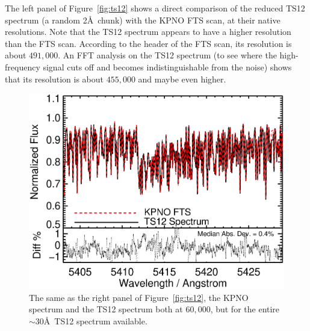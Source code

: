 The left panel of Figure~\ref{fig:ts12} shows a direct comparison of the reduced
TS12 spectrum (a random 2\AA\ chunk) with the KPNO FTS scan, at their
native resolutions. Note that the TS12 spectrum appears to have a
higher resolution than the FTS scan. According to the header of the
FTS scan, its resolution is about $491,000$. An FFT analysis on the TS12
spectrum (to see where the high-frequency signal cuts off and becomes
indistinguishable from the noise) shows that its resolution is about
$455,000$ and maybe even higher.


\begin{figure}[!th]
\centering
\includegraphics[angle=0.,scale=0.45]{het/all_60k_gaus_sclrem_diff.eps}
\caption{The same as the right panel of Figure~\ref{fig:ts12}, the
  KPNO spectrum and the TS12 spectrum both at $60,000$, but for the entire
  $\sim$30\AA\ TS12 spectrum available. 
  \label{fig:60k_all}}
\end{figure}


